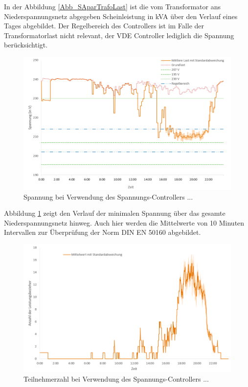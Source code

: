 In der Abbildung \ref{Abb_SAparTrafoLast} ist die vom Transformator ans Niederspannungsnetz abgegeben Scheinleistung in kVA über den Verlauf eines Tages abgebildet. Der Regelbereich des Controllers ist im Falle der Transformatorlast nicht relevant, der VDE Controller lediglich die Spannung berücksichtigt.
\begin{figure}[htb]
\centering
	\includegraphics[scale=0.7]{img/SA_par/Vm10m7.png}
	\caption{Spannung bei Verwendung des Spannungs-Controllers ...}
	\label{Abb_SAparSpannung}
\end{figure}
Abbildung \ref{Abb_SAparSpannung} zeigt den Verlauf der minimalen Spannung über das gesamte Niederspannungsnetz hinweg. Auch hier werden die Mittelwerte von 10 Minuten Intervallen zur Überprüfung der Norm DIN EN 50160 abgebildet.
\begin{figure}[htb]
\centering
	\includegraphics[scale=0.7]{img/SA_par/Teilnehmer.png}
	\caption{Teilnehmerzahl bei Verwendung des Spannungs-Controllers ...}
	\label{Abb_SAparTeilnehmer}
\end{figure}
